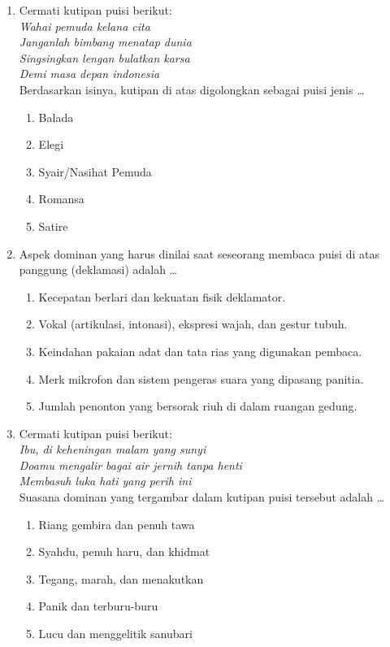 \documentclass[12pt,a4paper]{article}
\begin{document}
\begin{enumerate}[leftmargin=*]
\item Cermati kutipan puisi berikut:\\
\textit{Wahai pemuda kelana cita}\\
\textit{Janganlah bimbang menatap dunia}\\
\textit{Singsingkan lengan bulatkan karsa}\\
\textit{Demi masa depan indonesia}\\
Berdasarkan isinya, kutipan di atas digolongkan sebagai puisi jenis \dots
    \begin{enumerate}[label=\alph*.]
        \item Balada
        \item Elegi
        \item Syair/Nasihat Pemuda
        \item Romansa
        \item Satire
    \end{enumerate}

\item Aspek dominan yang harus dinilai saat seseorang membaca puisi di atas panggung (deklamasi) adalah \dots
    \begin{enumerate}[label=\alph*.]
        \item Kecepatan berlari dan kekuatan fisik deklamator.
        \item Vokal (artikulasi, intonasi), ekspresi wajah, dan gestur tubuh.
        \item Keindahan pakaian adat dan tata rias yang digunakan pembaca.
        \item Merk mikrofon dan sistem pengeras suara yang dipasang panitia.
        \item Jumlah penonton yang bersorak riuh di dalam ruangan gedung.
    \end{enumerate}

\item Cermati kutipan puisi berikut:\\
\textit{Ibu, di keheningan malam yang sunyi}\\
\textit{Doamu mengalir bagai air jernih tanpa henti}\\
\textit{Membasuh luka hati yang perih ini}\\
Suasana dominan yang tergambar dalam kutipan puisi tersebut adalah \dots
    \begin{enumerate}[label=\alph*.]
        \item Riang gembira dan penuh tawa
        \item Syahdu, penuh haru, dan khidmat
        \item Tegang, marah, dan menakutkan
        \item Panik dan terburu-buru
        \item Lucu dan menggelitik sanubari
    \end{enumerate}


\end{enumerate}
\end{document}
